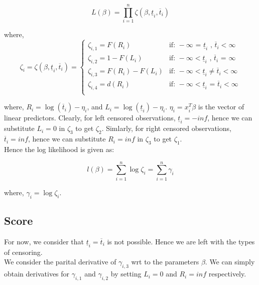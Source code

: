 \documentclass[12pt,a4paper]{report}
\begin{document}
\begin{equation}
L(\beta) = \prod_{i=1}^n \zeta(\beta, \underline t_i, \overline t_i)
\end{equation}

where,
\begin{equation} \label{zeta}
\zeta_i = \zeta(\beta, \underline t_i, \overline t_i) = \begin{cases}
													   \zeta_{i,1} = F(R_i) & \mbox{if: } -\infty \textbf{ = } \underline t_i \mbox{ , } \overline t_i<\infty \\
													   \zeta_{i,2} = 1- F(L_i) & \mbox{if: } -\infty < \underline t_i \mbox{ , }\overline t_i\textbf{ = }\infty \\
													   \zeta_{i,3} = F(R_i) - F(L_i) & \mbox{if: } -\infty < \underline t_i \ne \overline t_i<\infty \\
													   \zeta_{i,4} = d(R_i) & \mbox{if: } -\infty < \underline t_i \textbf{ = } \overline t_i<\infty \\
		\end{cases}
\end{equation}

where, $R_i = \log (\overline t_i) - \eta_i$, and $L_i = \log (\underline t_i) - \eta_i$. $\eta_i = x_i^T \beta$ is the vector of linear predictors.
Clearly, for left censored observations, $\underline t_i = -inf$, hence we can substitute $L_i = 0$ in $\zeta_3$ to get $\zeta_2$. 
Simlarly, for right censored observations, $\overline t_i = inf$, hence we can substitute $R_i = inf$ in $\zeta_3$ to get $\zeta_1$. \\

\vspace{8mm}
Hence the log likelihood is given as:

\begin{equation} \label{lik0}
l(\beta) = \sum_{i=1}^n \log \zeta_i = \sum_{i=1}^n \gamma_i %
\end{equation}

where, $\gamma_i = \log \zeta_i$.

\subsection*{Score}
For now, we consider that $\underline t_i = \overline t_i$ is not possible. Hence we are left with the types of censoring. \\
We consider the parital derivative  of $\gamma_{i,3}$ wrt to the parameters $\beta$. We can simply obtain derivatives for
$\gamma_{i,1}$ and $\gamma_{i,2}$ by setting $L_i = 0$ and $R_i = inf$ respectively.\\
\end{document}
